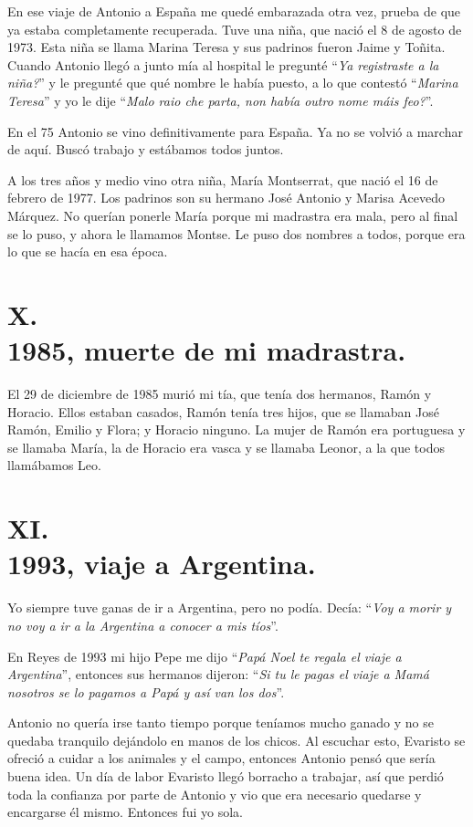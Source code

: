 \documentclass[12pt,a5paper]{book}
\begin{document}
En ese viaje de Antonio a España me quedé embarazada otra vez, prueba de que ya estaba completamente recuperada. Tuve una niña, que nació el 8 de agosto de 1973. Esta niña se llama Marina Teresa y sus padrinos fueron Jaime y Toñita. Cuando Antonio llegó a junto mía al hospital le pregunté ``\textit{Ya registraste a la niña?}'' y le pregunté que qué nombre le había puesto, a lo que contestó ``\textit{Marina Teresa}'' y yo le dije ``\textit{Malo raio che parta, non había outro nome máis feo?}''.

En el 75 Antonio se vino definitivamente para España. Ya no se volvió a marchar de aquí. Buscó trabajo y estábamos todos juntos.

A los tres años y medio vino otra niña, María Montserrat, que nació el 16 de febrero de 1977. Los padrinos son su hermano José Antonio y Marisa Acevedo Márquez. No querían ponerle María porque mi madrastra era mala, pero al final se lo puso, y ahora le llamamos Montse. Le puso dos nombres a todos, porque era lo que se hacía en esa época.

\section*{X.\\1985, muerte de mi madrastra.}

El 29 de diciembre de 1985 murió mi tía, que tenía dos hermanos, Ramón y Horacio. Ellos estaban casados, Ramón tenía tres hijos, que se llamaban José Ramón, Emilio y Flora; y Horacio ninguno. La mujer de Ramón era portuguesa y se llamaba María, la de Horacio era vasca y se llamaba Leonor, a la que todos llamábamos Leo.

\section*{XI.\\1993, viaje a Argentina.}

Yo siempre tuve ganas de ir a Argentina, pero no podía. Decía: ``\textit{Voy a morir y no voy a ir a la Argentina a conocer a mis tíos}''.
 
En Reyes de 1993 mi hijo Pepe me dijo ``\textit{Papá Noel te regala el viaje a Argentina}'', entonces sus hermanos dijeron: ``\textit{Si tu le pagas el viaje a Mamá nosotros se lo pagamos a Papá y así van los dos}''. 

Antonio no quería irse tanto tiempo porque teníamos mucho ganado y no se quedaba tranquilo dejándolo en manos de los chicos. Al escuchar esto, Evaristo se ofreció a cuidar a los animales y el campo, entonces Antonio pensó que sería buena idea. Un día de labor Evaristo llegó borracho a trabajar, así que perdió toda la confianza por parte de Antonio y vio que era necesario quedarse y encargarse él mismo. Entonces fui yo sola.
\end{document}
